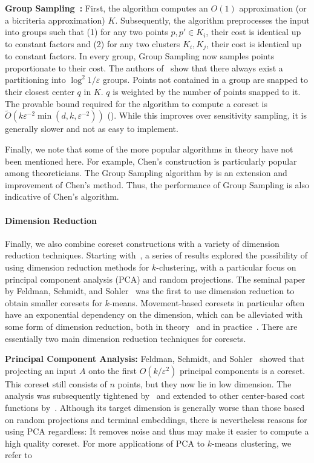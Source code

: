 {\bf Group Sampling~\cite{Cohen-AddadSS21}:} First, the algorithm computes an $O(1)$ approximation (or a bicriteria approximation) $K$. Subsequently, the algorithm preprocesses the input into groups such that (1) for any two points $p,p'\in K_i$, their cost is identical up to constant factors and (2) for any two clusters $K_i,K_j$, their cost is identical up to constant factors. In every group, Group Sampling now samples points proportionate to their cost. The authors of~\cite{Cohen-AddadSS21} show that there always exist a partitioning into $\log^2 1/\varepsilon$ groups. Points not contained in a group are snapped to their closest center $q$ in $K$. $q$ is weighted by the number of points snapped to it. The provable bound required for the algorithm to compute a coreset is $\tilde O\left(k\varepsilon^{-2}\min(d,k,\varepsilon^{-2})\right)$ (\cite{CLSS22}). While this improves over sensitivity sampling, it is generally slower and not as easy to implement.

Finally, we note that some of the more popular algorithms in theory have not been mentioned here. For example, Chen's \cite{Chen09} construction is particularly popular among theoreticians. The Group Sampling algorithm by \cite{Cohen-AddadSS21} is an extension and improvement of Chen's method. Thus, the performance of Group Sampling is also indicative of Chen's algorithm.


\paragraph*{Dimension Reduction}
Finally, we also combine coreset constructions with a variety of dimension reduction techniques. Starting with~\cite{DrineasFKVV04}, a series of results \cite{BecchettiBC0S19,BoutsidisMD09,BoutsidisZD10,BoutsidisZMD15,CEMMP15,Cohen-AddadS17,FeldmanSS20,FKW19,KuK10,MakarychevMR19,SohlerW18} explored the possibility of using dimension reduction methods for $k$-clustering, with a particular focus on principal component analysis (PCA) and random projections. The seminal paper by Feldman, Schmidt, and Sohler~\cite{FeldmanSS20} was the first to use dimension reduction to obtain smaller coresets for $k$-means. Movement-based coresets in particular often have an exponential dependency on the dimension, which can be alleviated with some form of dimension reduction, both in theory~\cite{SSS19} and in practice~\cite{KappmeierS015}.
There are essentially two main dimension reduction techniques for coresets.

{\bf Principal Component Analysis:} Feldman, Schmidt, and Sohler~\cite{FeldmanSS20} showed that projecting an input $A$ onto the first $O(k/\varepsilon^2)$ principal components is a coreset. This coreset still consists of $n$ points, but they now lie in low dimension. The analysis was subsequently tightened by~\cite{CEMMP15} and extended to other center-based cost functions by~\cite{SohlerW18}. Although its target dimension is generally worse than those based on random projections and terminal embeddings, there is nevertheless reasons for using PCA regardless: It removes noise and thus may make it easier to compute a high quality coreset. For more applications of PCA to $k$-means clustering, we refer to

